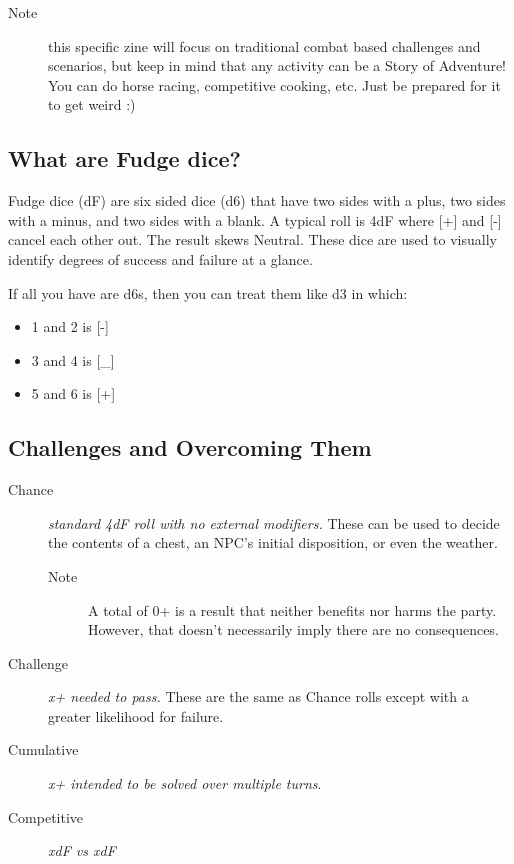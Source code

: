 \documentclass[statementpaper,oneside,article,12pt]{memoir}
\begin{document}
	\begin{description}
		\item[Note] this specific zine will focus on traditional combat based challenges and scenarios, but keep in mind that any activity can be a Story of Adventure!  You can do horse racing, competitive cooking, etc. Just be prepared for it to get weird :)
	\end{description}
	
	\subsection*{What are Fudge dice?}
	Fudge dice (dF) are six sided dice (d6) that have two sides with a plus, two sides with a minus, and two sides with a blank. A typical roll is 4dF where [+] and [-] cancel each other out. The result skews Neutral. These dice are used to visually identify degrees of success and failure at a glance. 
	
	If all you have are d6s, then you can treat them like d3 in which:
	\begin{itemize}
		\item 1 and 2 is [-]
		\item 3 and 4 is [\_]
		\item 5 and 6 is [+]
	\end{itemize}
	
	\subsection*{Challenges and Overcoming Them}
	\begin{description}
		\item[Chance] \textit{standard 4dF roll with no external modifiers.} These can be used to decide the contents of a chest, an NPC's initial disposition, or even the weather.
		\begin{description}
			\item[Note] A total of 0+ is a result that neither benefits nor harms the party. However, that doesn't necessarily imply there are no consequences.
		\end{description}
		\item[Challenge] \textit{x+ needed to pass.} These are the same as Chance rolls except with a greater likelihood for failure. 
		\item[Cumulative] \textit{x+ intended to be solved over multiple turns}. 
		\item[Competitive] \textit{xdF vs xdF}
	\end{description}
		
\end{document}
